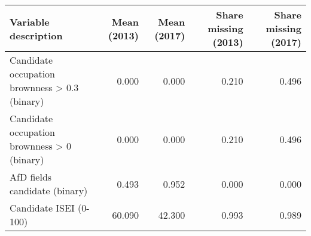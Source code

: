 \begin{table}[!h]
\centering
\begin{tabular}[t]{lrrrr}
\toprule
Variable description & Mean (2013) & Mean (2017) & Share missing (2013) & Share missing (2017)\\
\midrule
Candidate occupation brownness > 0.3 (binary) & 0.000 & 0.000 & 0.210 & 0.496\\
Candidate occupation brownness > 0 (binary) & 0.000 & 0.000 & 0.210 & 0.496\\
AfD fields candidate (binary) & 0.493 & 0.952 & 0.000 & 0.000\\
Candidate ISEI (0-100) & 60.090 & 42.300 & 0.993 & 0.989\\
\bottomrule
\end{tabular}
\end{table}
